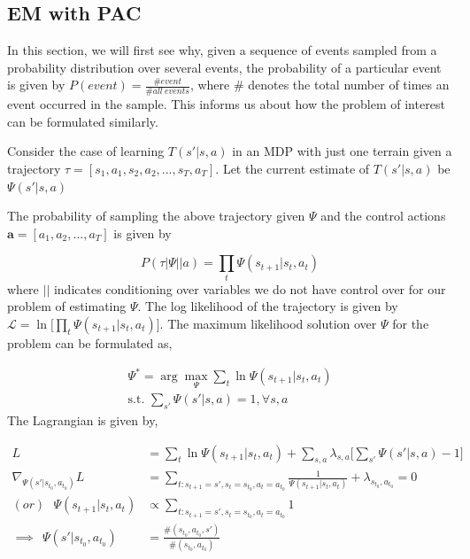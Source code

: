 \documentclass{article}[11pt]
\begin{document}
\subsection{EM with PAC}
In this section, we will first see why, given a sequence of events sampled from a probability distribution over several events, the probability of a particular event is given by $P(event) = \frac{\# event}{\# all \ events}$, where $\#$ denotes the total number of times an event occurred in the sample. This informs us about how the problem of interest can be formulated similarly. 

Consider the case of learning $T(s'|s,a)$ in an MDP with just one terrain given a trajectory $\tau = [s_1,a_1,s_2,a_2, ..., s_T,a_T]$. Let the current estimate of $T(s'|s,a)$ be $\Psi(s'|s,a)$ 

The probability of sampling the above trajectory given $\Psi$ and the control actions $\textbf{a} = [a_1, a_2, ..., a_T]$ is given by

\begin{equation}
P(\tau|\Psi || a) = \prod_t \Psi(s_{t+1}|s_t,a_t)
\end{equation} where $||$ indicates conditioning over variables we do not have control over for our problem of estimating $\Psi$. The log likelihood of the trajectory is given by $\mathcal{L} = \ln \Big[ \prod_t \Psi(s_{t+1}|s_t,a_t) \Big]$. The maximum likelihood solution over $\Psi$ for the problem can be formulated as, 

\begin{align}
\label{ori_objective}
\Psi^* = \arg \max_\Psi  \sum_t \ln \Psi(s_{t+1}|s_t,a_t)\\
\text{s.t. }\sum_{s'} \Psi(s'|s,a) = 1, \forall s,a
\end{align}The Lagrangian is given by, 

\begin{align}
\label{Lagrangian}
L &= \sum_t \ln \Psi(s_{t+1}|s_t,a_t)  + \sum_{s,a} \lambda_{s,a} \Big[ \sum_{s'} \Psi(s'|s,a) - 1\Big]\\
\nabla_{\Psi(s'|s_{t_0},a_{t_0})}L &= \sum_{t:s_{t+1} = s', s_t = s_{t_0}, a_t = a_{t_0}} \frac{1}{\Psi(s_{t+1}|s_t,a_t)} + \lambda_{s_{t_0},a_{t_0}} = 0\\
\label{prop}
(or) \ \ \  \Psi(s_{t+1}|s_t,a_t) &\propto \sum_{t:s_{t+1} = s', s_t = s_{t_0}, a_t = a_{t_0}}1\\
\label{ML_oridinary_case}
\implies \ \ \Psi(s'|s_{t_0},a_{t_0}) &= \frac{\#(s_{t_0},a_{t_0},s')}{\#(s_{t_0},a_{t_0})}
\end{align}
\end{document}
